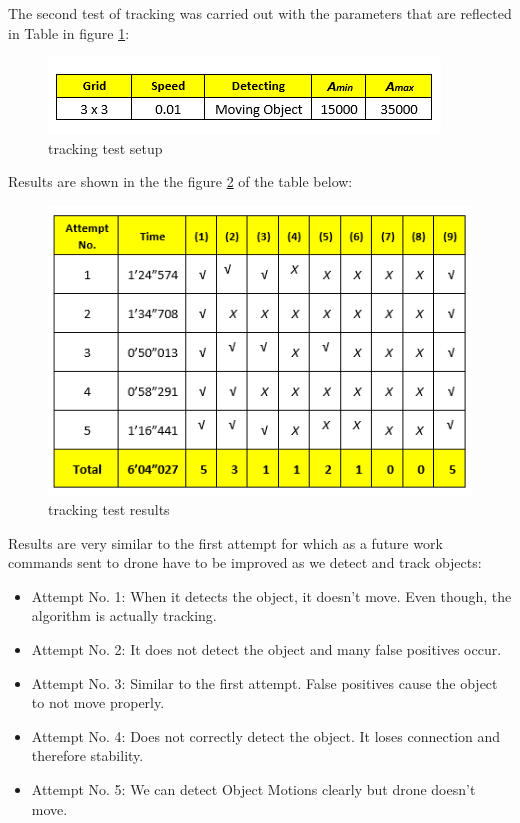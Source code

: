 The second test of tracking was carried out with the parameters that are reflected in Table in figure \ref{tracking_test_setup}:

\begin{figure}[ht]
\centering
\includegraphics[scale=0.8]{figures/tracking_test_settings_1.png}
\caption{tracking test setup}
\label{tracking_test_setup}
\end{figure}

Results are shown in the the figure \ref{tracking_test_results_2} of the table below:

\begin{figure}[ht]
\centering
\includegraphics[scale=0.8]{figures/tracking_test_results_2.png}
\caption{tracking test results}
\label{tracking_test_results_2}
\end{figure}

Results are very similar to the first attempt for which as a future work commands sent to drone have to be improved as we detect and track objects:

\begin{itemize}
\item Attempt No. 1: When it detects the object, it doesn’t move. Even though, the algorithm is actually tracking.
\item Attempt No. 2: It does not detect the object and many false positives occur.
\item Attempt No. 3: Similar to the first attempt. False positives cause the object to not move properly.
\item Attempt No. 4: Does not correctly detect the object. It loses connection and therefore stability.
\item Attempt No. 5: We can detect Object Motions clearly but drone doesn’t move.
\end{itemize}

